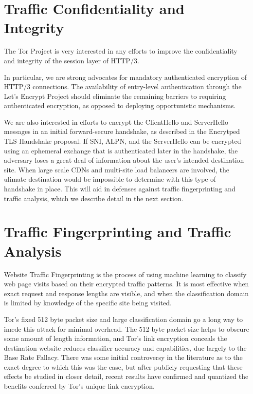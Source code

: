 \documentclass[letterpaper,11pt]{llncs}
\begin{document}
\section{Traffic Confidentiality and Integrity}

The Tor Project is very interested in any efforts to improve the
confidentiality and integrity of the session layer of HTTP/3. 

In particular, we are strong advocates for mandatory authenticated encryption
of HTTP/3 connections.  The availability of entry-level authentication through
the Let's Encrypt Project should eliminate the remaining barriers to requiring
authenticated encryption, as opposed to deploying opportunistic mechanisms.

We are also interested in efforts to encrypt the ClientHello and ServerHello
messages in an initial forward-secure handshake, as described in the Encrytped
TLS Handshake proposal. If SNI, ALPN, and the ServerHello can be encrypted
using an ephemeral exchange that is authenticated later in the handshake,
the adversary loses a great deal of information about the user's intended
destination site. When large scale CDNs and multi-site load balancers are
involved, the ulimate destination would be impossible to determine with this
type of handshake in place. This will aid in defenses against traffic
fingerprinting and traffic analysis, which we describe detail in the next
section.


\section{Traffic Fingerprinting and Traffic Analysis}

Website Traffic Fingerprinting is the process of using machine learning to
classify web page visits based on their encrypted traffic patterns. It is most
effective when exact request and response lengths are visible, and when the
classification domain is limited by knowledge of the specific site being
visited.

Tor's fixed 512 byte packet size and large classification domain go a long way
to imede this attack for minimal overhead. The 512 byte packet size helps to
obscure some amount of length information, and Tor's link encryption conceals
the destination website reduces classifier accuracy and capabilities, due
largely to the Base Rate Fallacy. There was some initial controversy in the
literature as to the exact degree to which this was the case, but after
publicly requesting that these effects be studied in closer detail, recent
results have confirmed and quantized the benefits conferred by Tor's unique
link encryption.
\end{document}
